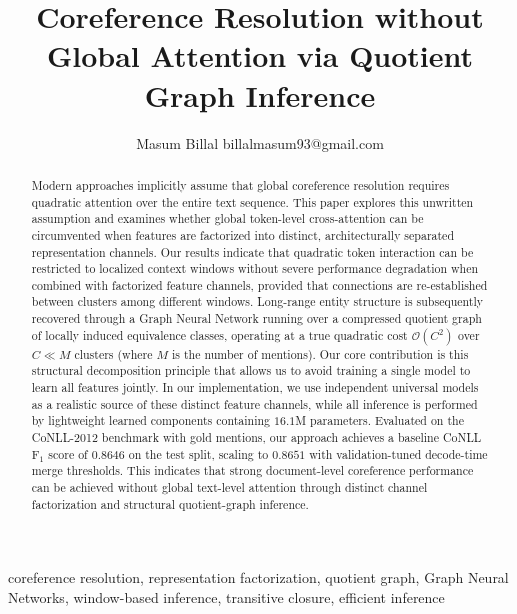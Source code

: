 \documentclass[12pt]{article}
\begin{document}
	
	\title{Coreference Resolution without Global Attention via Quotient Graph Inference}
	
	\author{\name Masum Billal \email billalmasum93@gmail.com \addr}
	
	
	\maketitle
	
	\begin{abstract}
		Modern approaches implicitly assume that global coreference resolution requires quadratic attention over the entire text sequence. This paper explores this unwritten assumption and examines whether global token-level cross-attention can be circumvented when features are factorized into distinct, architecturally separated representation channels. Our results indicate that quadratic token interaction can be restricted to localized context windows without severe performance degradation when combined with factorized feature channels, provided that connections are re-established between clusters among different windows. Long-range entity structure is subsequently recovered through a Graph Neural Network running over a compressed quotient graph of locally induced equivalence classes, operating at a true quadratic cost $\mathcal{O}(C^2)$ over $C \ll M$ clusters (where $M$ is the number of mentions). Our core contribution is this structural decomposition principle that allows us to avoid training a single model to learn all features jointly. In our implementation, we use independent universal models as a realistic source of these distinct feature channels, while all inference is performed by lightweight learned components containing $16.1$M parameters. Evaluated on the CoNLL-2012 benchmark with gold mentions, our approach achieves a baseline CoNLL F$_1$ score of $0.8646$ on the test split, scaling to $0.8651$ with validation-tuned decode-time merge thresholds. This indicates that strong document-level coreference performance can be achieved without global text-level attention through distinct channel factorization and structural quotient-graph inference.
	\end{abstract}
	
	\begin{keywords}
		coreference resolution, representation factorization, quotient graph, Graph Neural Networks, window-based inference, transitive closure, efficient inference
	\end{keywords}
	
\end{document}
